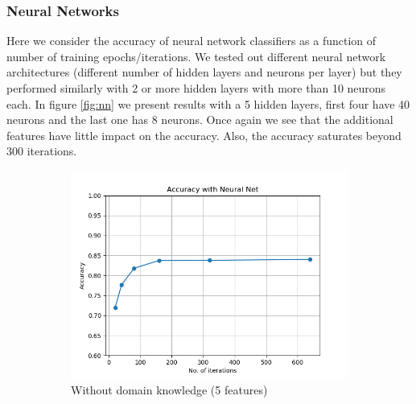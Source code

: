 \documentclass{article}
\begin{document}
\subsubsection{Neural Networks}
Here we consider the accuracy of neural network classifiers as a function of number of training epochs/iterations. We tested out different neural network architectures (different number of hidden layers and neurons per layer) but they performed similarly with 2 or more hidden layers with more than 10 neurons each. In figure \ref{fig:nn} we present results with a 5 hidden layers, first four have 40 neurons and the last one has 8 neurons. Once again we see that the additional features have little impact on the accuracy. Also, the accuracy saturates beyond 300 iterations.

\begin{figure}[h!]
    \centering
    \begin{subfigure}[b]{0.45\textwidth}
        \includegraphics[width=\textwidth]{../figures/wo_domain_knowledge/accuracy_neural_nets.png}
        \caption{Without domain knowledge (5  features)}
        \label{fig:gull}
    \end{subfigure}
    ~ %
    \begin{subfigure}[b]{0.45\textwidth}

\end{subfigure}
\end{figure}
\end{document}
